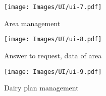 
\begin{figure}[H]
	\centering
    \texttt{[image: Images/UI/ui-7.pdf]}
	\caption{\label{fig:bpmn_sign_up}Area management}
\end{figure}
\newpage
\begin{figure}[H]
	\centering
    \texttt{[image: Images/UI/ui-8.pdf]}
	\caption{\label{fig:bpmn_sign_up}Answer to request, data of area}
\end{figure}

\begin{figure}[H]
	\centering
    \texttt{[image: Images/UI/ui-9.pdf]}
	\caption{\label{fig:bpmn_sign_up}Dairy plan management}
\end{figure}
